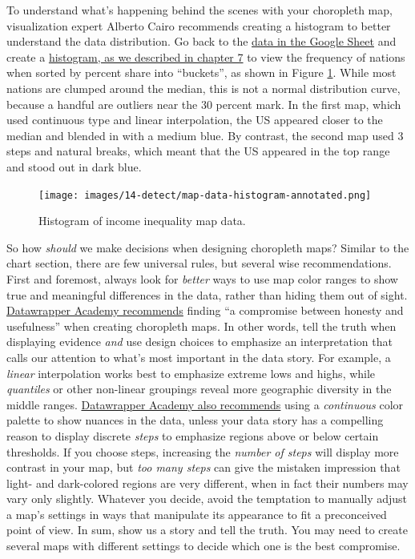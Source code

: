 \documentclass[
  english,
]{book}
\begin{document}
To understand what's happening behind the scenes with your choropleth map, visualization expert Alberto Cairo recommends creating a histogram to better understand the data distribution. Go back to the \href{https://docs.google.com/spreadsheets/d/1IomO4pyGziTZnQrlSnlO11zqgdohwwTm2olR2-tGPfI/edit\#gid=1463939565}{data in the Google Sheet} and create a \href{histogram-google.html}{histogram, as we described in chapter 7} to view the frequency of nations when sorted by percent share into ``buckets'', as shown in Figure \ref{fig:map-data-histogram}. While most nations are clumped around the median, this is not a normal distribution curve, because a handful are outliers near the 30 percent mark. In the first map, which used continuous type and linear interpolation, the US appeared closer to the median and blended in with a medium blue. By contrast, the second map used 3 steps and natural breaks, which meant that the US appeared in the top range and stood out in dark blue.



\begin{figure}
\centering
\texttt{[image: images/14-detect/map-data-histogram-annotated.png]}
\caption{\label{fig:map-data-histogram}Histogram of income inequality map data.}
\end{figure}

So how \emph{should} we make decisions when designing choropleth maps? Similar to the chart section, there are few universal rules, but several wise recommendations. First and foremost, always look for \emph{better} ways to use map color ranges to show true and meaningful differences in the data, rather than hiding them out of sight. \href{https://academy.datawrapper.de/article/117-color-palette-for-your-map}{Datawrapper Academy recommends} finding ``a compromise between honesty and usefulness'' when creating choropleth maps. In other words, tell the truth when displaying evidence \emph{and} use design choices to emphasize an interpretation that calls our attention to what's most important in the data story. For example, a \emph{linear} interpolation works best to emphasize extreme lows and highs, while \emph{quantiles} or other non-linear groupings reveal more geographic diversity in the middle ranges. \href{https://academy.datawrapper.de/article/134-what-to-consider-when-creating-choropleth-maps}{Datawrapper Academy also recommends} using a \emph{continuous} color palette to show nuances in the data, unless your data story has a compelling reason to display discrete \emph{steps} to emphasize regions above or below certain thresholds. If you choose steps, increasing the \emph{number of steps} will display more contrast in your map, but \emph{too many steps} can give the mistaken impression that light- and dark-colored regions are very different, when in fact their numbers may vary only slightly. Whatever you decide, avoid the temptation to manually adjust a map's settings in ways that manipulate its appearance to fit a preconceived point of view. In sum, show us a story and tell the truth. You may need to create several maps with different settings to decide which one is the best compromise.
\end{document}
